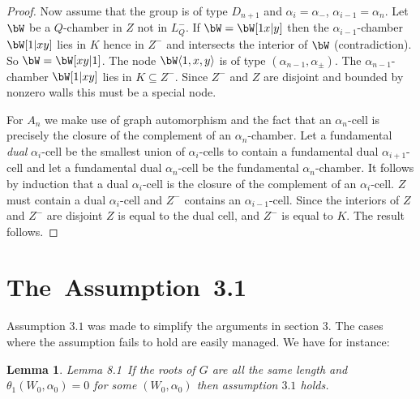 \documentclass{memo-l}
\newtheorem{lemma}[theorem]{Lemma}
\theoremstyle{definition}
\theoremstyle{remark}
\numberwithin{section}{chapter}
\numberwithin{equation}{chapter}
\begin{document}
\begin{proof}


   Now assume that the group is of type $D_{n+1}$ and
${\alpha_i} = {\alpha}_{-}$, $\alpha_{i-1}=\alpha_n$. 
Let $\bW$ be a $Q$-chamber in 
$Z$ not in
$L_{Q}^{-}$.  If $\bW = \bW [1x\vert y]$ 
then the ${\alpha_{i-1}}$-chamber
$\bW[1\vert xy]$ lies in $K$ hence in $Z^{-}$ and 
intersects the interior of $\bW$ (contradiction).  
So $\bW = \bW [xy\vert 1]$.
The node $\bW\langle 1,x,y\rangle $ is of type 
$({\alpha}_{n-1},{\alpha}_{\pm})$.
The ${\alpha}_{n-1}$-chamber $\bW[1\vert xy]$ lies in
$K \subseteq Z^{-}$.  Since $Z^{-}$ and $Z$ are disjoint and bounded by
nonzero walls this must be a special node.

	              \medskip
		      \medskip

For $A_{n}$ we make
use of graph automorphism and the fact that an ${\alpha}_{n}$-cell is
precisely the closure of the complement of an ${\alpha}_{n}$-chamber.  Let
a fundamental {\it dual} ${\alpha}_{i}$-cell be the smallest union of
${\alpha}_{i}$-cells to contain a fundamental dual ${\alpha}_{i+1}$-cell
and let a fundamental dual ${\alpha}_{n}$-cell be the fundamental
${\alpha}_{n}$-chamber.  It follows by induction that a dual
${\alpha}_{i}$-cell is the closure of the complement of an
${\alpha}_{i}$-cell.  $Z$ must contain a dual ${\alpha}_{i}$-cell and
$Z^{-}$ contains an ${\alpha}_{i-1}$-cell.  Since the interiors of $Z$ and
$Z^{-}$ are disjoint $Z$ is equal to the dual cell, and $Z^{-}$ is equal to
$K$.  The result follows.
\end{proof} 

\section{The\ Assumption\ 3.1}

   Assumption $3.1$ was made to simplify the arguments in section $3$.  The
cases where the assumption fails to hold are easily managed.  We have for
instance:



\begin{lemma}{Lemma 8.1}\ If the roots of $G$ are all the same length and
${\theta}_{1}(W_{0},{\alpha}_{0})=0$ for some $(W_{0},{\alpha}_{0})$ then
assumption $3.1$ holds.
\end{lemma}
\end{document}
